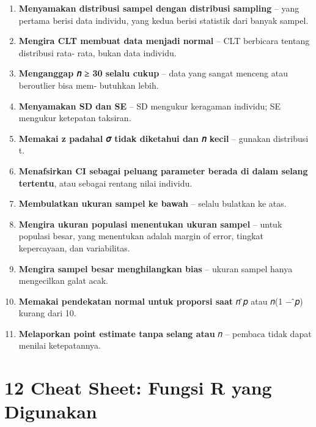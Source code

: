 \documentclass[
  indonesian,
  letterpaper,
]{book}
\providecommand{\tightlist}{%
  \setlength{\itemsep}{0pt}\setlength{\parskip}{0pt}}
\begin{document}
\begin{enumerate}
\def\labelenumi{\arabic{enumi}.}
\tightlist
\item
  \textbf{Menyamakan distribusi sampel dengan distribusi sampling} --
  yang pertama berisi data individu, yang kedua berisi statistik dari
  banyak sampel.
\item
  \textbf{Mengira CLT membuat data menjadi normal} -- CLT berbicara
  tentang distribusi rata- rata, bukan data individu.
\item
  \textbf{Menganggap 𝑛 ≥ 30 selalu cukup} -- data yang sangat menceng
  atau beroutlier bisa mem- butuhkan lebih.
\item
  \textbf{Menyamakan SD dan SE} -- SD mengukur keragaman individu; SE
  mengukur ketepatan taksiran.
\item
  \textbf{Memakai z padahal 𝜎 tidak diketahui dan 𝑛 kecil} -- gunakan
  distribusi t.
\item
  \textbf{Menafsirkan CI sebagai peluang parameter berada di dalam
  selang tertentu}, atau sebagai rentang nilai individu.
\item
  \textbf{Membulatkan ukuran sampel ke bawah} -- selalu bulatkan ke
  atas.
\item
  \textbf{Mengira ukuran populasi menentukan ukuran sampel} -- untuk
  populasi besar, yang menentukan adalah margin of error, tingkat
  kepercayaan, dan variabilitas.
\item
  \textbf{Mengira sampel besar menghilangkan bias} -- ukuran sampel
  hanya mengecilkan galat acak.
\item
  \textbf{Memakai pendekatan normal untuk proporsi saat} 𝑛 ̂𝑝 atau 𝑛(1 −
  ̂𝑝) kurang dari 10.
\item
  \textbf{Melaporkan point estimate tanpa selang atau} 𝑛 -- pembaca
  tidak dapat menilai ketepatannya.
\end{enumerate}


\chapter{12 Cheat Sheet: Fungsi R yang
Digunakan}\label{cheat-sheet-fungsi-r-yang-digunakan}
\end{document}
